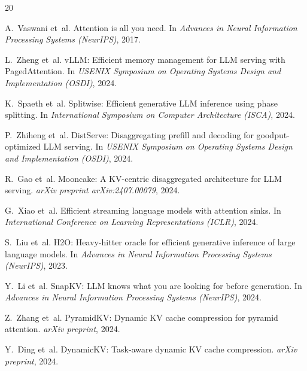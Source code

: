 \documentclass[11pt]{article}
\theoremstyle{definition}
\theoremstyle{plain}
\begin{document}
\begin{thebibliography}{20}

A.~Vaswani et~al.
\newblock Attention is all you need.
\newblock In \emph{Advances in Neural Information Processing Systems (NeurIPS)}, 2017.

L.~Zheng et~al.
\newblock vLLM: Efficient memory management for LLM serving with PagedAttention.
\newblock In \emph{USENIX Symposium on Operating Systems Design and Implementation (OSDI)}, 2024.

K.~Spaeth et~al.
\newblock Splitwise: Efficient generative LLM inference using phase splitting.
\newblock In \emph{International Symposium on Computer Architecture (ISCA)}, 2024.

P.~Zhiheng et~al.
\newblock DistServe: Disaggregating prefill and decoding for goodput-optimized LLM serving.
\newblock In \emph{USENIX Symposium on Operating Systems Design and Implementation (OSDI)}, 2024.

R.~Gao et~al.
\newblock Mooncake: A KV-centric disaggregated architecture for LLM serving.
\newblock \emph{arXiv preprint arXiv:2407.00079}, 2024.

G.~Xiao et~al.
\newblock Efficient streaming language models with attention sinks.
\newblock In \emph{International Conference on Learning Representations (ICLR)}, 2024.

S.~Liu et~al.
\newblock H2O: Heavy-hitter oracle for efficient generative inference of large language models.
\newblock In \emph{Advances in Neural Information Processing Systems (NeurIPS)}, 2023.

Y.~Li et~al.
\newblock SnapKV: LLM knows what you are looking for before generation.
\newblock In \emph{Advances in Neural Information Processing Systems (NeurIPS)}, 2024.

Z.~Zhang et~al.
\newblock PyramidKV: Dynamic KV cache compression for pyramid attention.
\newblock \emph{arXiv preprint}, 2024.

Y.~Ding et~al.
\newblock DynamicKV: Task-aware dynamic KV cache compression.
\newblock \emph{arXiv preprint}, 2024.


\end{thebibliography}
\end{document}
